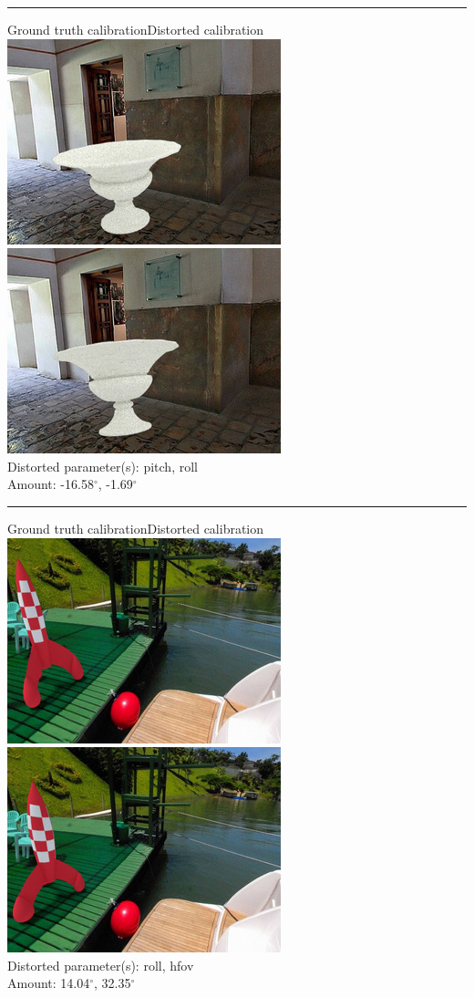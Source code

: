 \begin{minipage}{\linewidth}
\centering
\hrule\vspace{1em}
Ground truth calibration\hspace{0.2\linewidth}Distorted calibration\\\vspace{0.5em}
\includegraphics[width=0.45\linewidth]{study/thumb/pano_ahxngimugqzaln-1_7_gt.jpg}
\includegraphics[width=0.45\linewidth]{study/thumb/pano_ahxngimugqzaln-1_7_dc.jpg}\\
Distorted parameter(s): pitch, roll\\
Amount: -16.58$^\circ$, -1.69$^\circ$
\end{minipage}

\begin{minipage}{\linewidth}
\centering
\hrule\vspace{1em}
Ground truth calibration\hspace{0.2\linewidth}Distorted calibration\\\vspace{0.5em}
\includegraphics[width=0.45\linewidth]{study/thumb/pano_ahxngxlbcrplaw-6_0_gt.jpg}
\includegraphics[width=0.45\linewidth]{study/thumb/pano_ahxngxlbcrplaw-6_0_dc.jpg}\\
Distorted parameter(s): roll, hfov\\
Amount: 14.04$^\circ$, 32.35$^\circ$
\end{minipage}

